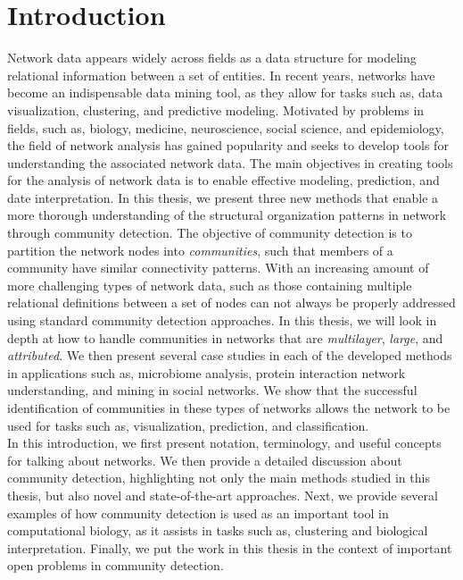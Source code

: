 





% 

\chapter{Introduction}
Network data appears widely across fields as a data structure for modeling relational information between a set of entities.  In recent years, networks have become an indispensable data mining tool, as they allow for tasks such as, data visualization, clustering, and predictive modeling.  Motivated by problems in fields, such as, biology, medicine, neuroscience, social science, and epidemiology, the field of network analysis has gained popularity and seeks to develop tools for understanding the associated network data. The main objectives in creating tools for the analysis of network data is to enable effective modeling, prediction, and date interpretation. In this thesis, we present three new methods that enable a more thorough understanding of the structural organization patterns in network through community detection. The objective of community detection is to partition the network nodes into \emph{communities}, such that members of a community have similar connectivity patterns. With an increasing amount of more challenging types of network data, such as those containing multiple relational definitions between a set of nodes can not always be properly addressed using standard community detection approaches. In this thesis, we will look in depth at how to handle communities in networks that are \emph{multilayer}, \emph{large}, and \emph{attributed}. We then present several case studies in each of the developed methods in applications such as, microbiome analysis, protein interaction network understanding, and mining in social networks. We show that the successful identification of communities in these types of networks allows the network to be used for tasks such as, visualization, prediction, and classification. \\
\indent In this introduction, we first present notation, terminology, and useful concepts for talking about networks. We then provide a detailed discussion about community detection, highlighting not only the main methods studied in this thesis, but also novel and state-of-the-art approaches. Next, we provide several examples of how community detection is used as an important tool in computational biology, as it assists in tasks such as, clustering and biological interpretation. Finally, we put the work in this thesis in the context of important open problems in community detection. 

